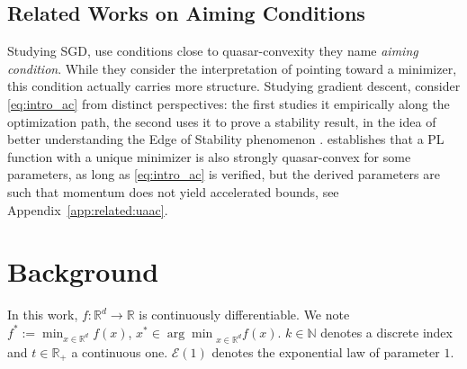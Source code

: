 \documentclass{article}
\newcommand{\jh}[1]{{\color{red} #1}}
\def\R{{\mathbb{R}}}
\def\N{{\mathbb{N}}}
\def\xgen{\{x_t \}_{t\in \mathcal{K}}}
\theoremstyle{plain}
\theoremstyle{definition}
\theoremstyle{remark}
\begin{document}










\subsection{Related Works on Aiming Conditions}\label{sec:related_aiming}
Studying SGD,
\cite{liu2023aiming,guptanesterov,alimisis2025we} use conditions close to quasar-convexity they name \textit{aiming condition}. While they consider the interpretation of pointing toward a minimizer, this condition actually carries more structure. Studying gradient descent, \cite{guille2024no,singh2025directionality} consider \eqref{eq:intro_ac} from distinct perspectives: the first studies it empirically along the optimization path, the second uses it to prove a stability result, in the idea of better understanding the Edge of Stability phenomenon \cite{cohengradient}.  \cite{hermant2024study} establishes that a PL function with a unique minimizer is also strongly quasar-convex for some parameters, as long as \eqref{eq:intro_ac} is verified, but the derived parameters are such that momentum does not yield accelerated bounds, see Appendix~\ref{app:related:uaac}.
\section{Background}
In this work, $f:\R^d \to \R$ is continuously differentiable. We note $f^\ast := \min_{x \in \R^d} f(x)$, $x^\ast \in {\arg\min}_{x\in \R^d} f(x)$. 
$k \in \N$ denotes a discrete index and $t \in \R_+$ a continuous one. $\mathcal{E}(1)$ denotes the exponential law of parameter $1$. 
\end{document}
